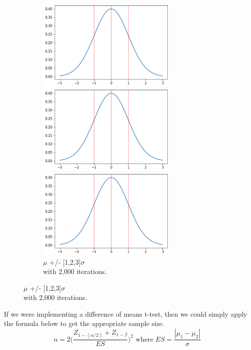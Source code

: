 \documentclass[12pt]{article}
\begin{document}
\begin{figure}[b]
\begin{subfigure}{.32\textwidth}
    \centering
    \includegraphics[width=0.75\textwidth]{sd_3.png}
    \caption[short]{$\mu$ +/- [1]$\sigma$ \\with 2,000 iterations.}
    \includegraphics[width=0.75\textwidth]{sd_3.png}
    \caption[short]{$\mu$ +/- [1,2]$\sigma$ \\with 2,000 iterations.}
    \includegraphics[width=0.75\textwidth]{sd_3.png}
    \caption[short]{$\mu$ +/- [1,2,3]$\sigma$ \\with 2,000 iterations.}
\end{subfigure}
\end{figure}


\newpage
If we were implementing a difference of means t-test, then we could simply apply the formula below to get the appropriate sample size.
\[n = 2 \Bigg(\frac{Z_{1-(\alpha/2)}+Z_{1-\beta}}{ES}\Bigg)^2 \text{  where  } ES = \frac{|\mu_1-\mu_2|}{\sigma}\]
\end{document}
